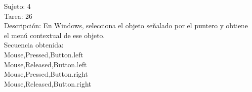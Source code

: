 Sujeto: 4	\\
Tarea: 26	\\
Descripci\'on: En Windows, selecciona el objeto se\~nalado por el puntero y obtiene el men\'u contextual de ese objeto.	\\
Secuencia obtenida:\\	
Mouse,Pressed,Button.left	\\
Mouse,Released,Button.left	\\
Mouse,Pressed,Button.right	\\
Mouse,Released,Button.right	\\







\begin{comment}

\subsection{Introducci\'{o}n}
\label{sec:1}
Las tecnicas de ...\\

Recientemente se considero ... \\

En este trabajo se presentan las principales consideraciones de implantacionde ... 
 


\subsection{Experimentos y resultados}
\subsubsection{M\'{e}tricas para ...}
Para evaluar el desempeno de ...
\begin{itemize}
\item Costo computacional
\item Rapidez
\item Ventaja (speedup)
\item Eficiencia 
\end{itemize}
El costo computacional, $C$, lo definimos ...
\begin{equation}
V =\frac{1}{C}
\label{eq:06}
\end{equation}
La ventaja (speedup) es la tasa que resulta de dividir la rapidez de la variante de interes  entre la rapidez de la variante de referencia (por ejemplo, la variante secuencial).
\begin{equation}
S =\frac{V_{obj}}{V_{ref}}
\label{eq:06}
\end{equation}
Finalmente...  



\end{comment}
